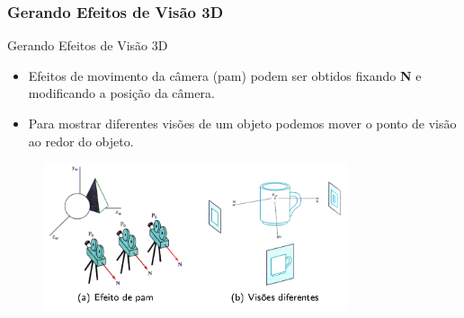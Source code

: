 \documentclass{beamer}
\begin{document}
\begin{frame}
\frametitle{Gerando Efeitos de Visão 3D}
	\begin{block}{Gerando Efeitos de Visão 3D}
		\begin{itemize}
			\item Efeitos de movimento da câmera (pam) podem ser obtidos fixando \textbf{N} e modificando a posição da câmera.
			\item Para mostrar diferentes visões de um objeto podemos mover o ponto de visão ao redor do objeto.
		\end{itemize}
	\end{block}
	
	\begin{figure}[!h]
			\begin{center}
			\includegraphics[width=0.8\textwidth]{Figures/camEfe}
			\end{center}
	\end{figure}
\end{frame}
\end{document}
